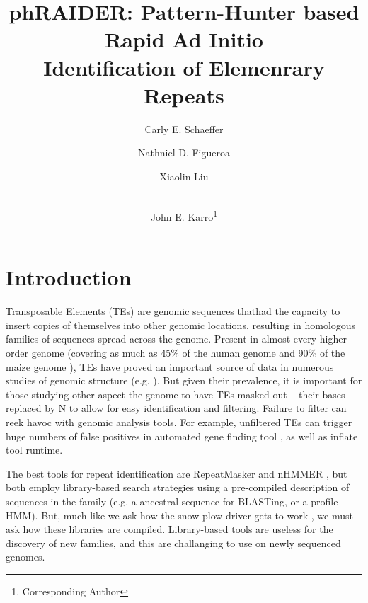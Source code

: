 \documentclass[10pt]{article}
\title{phRAIDER: Pattern-Hunter based Rapid Ad Initio \\ Identification of Elemenrary Repeats}
\author[1]{Carly E. Schaeffer}
\author[1]{Nathniel D. Figueroa}
\author[2]{Xiaolin Liu}
\author[1,2,3,4]{\\John E. Karro\thanks{Corresponding Author}}
\affil[1]{Department of Computer Science and Software Engineering}
\affil[2]{Cell, Molecular, and Structural Bology}
\affil[3]{Department of Microbiology}
\affil[4]{Department of Statisticcs, Miami University, Oxford, Ohio (USA)}
\date{}
\begin{document}
\maketitle
{}

\section*{Introduction}

Transposable Elements (TEs) are genomic sequences thathad the capacity
to insert copies of themselves into other genomic locations, resulting
in homologous families of sequences spread across the genome.  Present
in almost every higher order genome (covering as much as 45\% of the
human genome and 90\% of the maize genome
\cite{Venter:2001p92,SanMiguel:1996wa}), TEs have proved an important
source of data in numerous studies of genomic structure (e.g.
\cite{Arndt:2005p279,Karro:2008p123,Mugal:2009p581,Hardison:2003p97}).
But given their prevalence, it is important for those studying other
aspect the genome to have TEs masked out -- their bases replaced by N
to allow for easy identification and filtering.  Failure to filter can
reek havoc with genomic analysis tools.  For example, unfiltered TEs can trigger
huge numbers of false positives in automated gene finding tool
\cite{Jiang:2013jt}, as well as inflate tool runtime.

The best tools for repeat identification are RepeatMasker and nHMMER
\cite{RepeatMaskerOpen:XkNxXSd7,Wheeler:2013gj}, but both employ 
library-based search strategies using a pre-compiled
description of sequences in the family (e.g. a ancestral sequence for
BLASTing, or a profile HMM).  But, much like we ask how
the snow plow driver gets to work \cite{Pratchett:uw}, we must ask how
these libraries are compiled.  Library-based tools
are useless for the discovery of new families, and this are
challanging to use on newly sequenced genomes.
\end{document}
